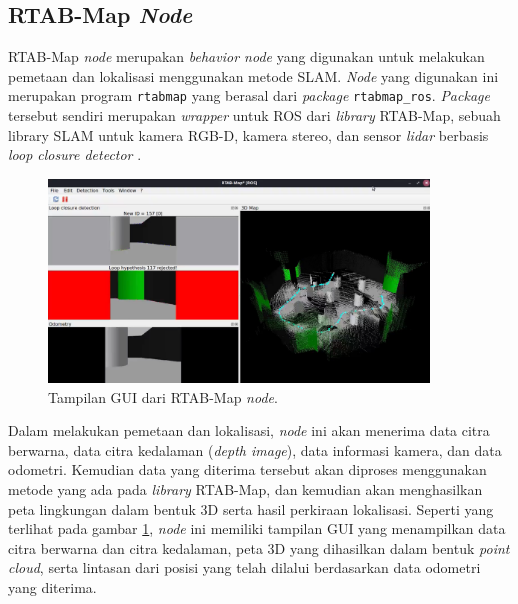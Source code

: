 \subsection{RTAB-Map \emph{Node}}
\label{subsec:rtabmapnode}

RTAB-Map \emph{node} merupakan \emph{behavior node} yang digunakan untuk melakukan pemetaan dan lokalisasi menggunakan metode SLAM.
\emph{Node} yang digunakan ini merupakan program \lstinline{rtabmap} yang berasal dari \emph{package} \lstinline{rtabmap_ros}.
\emph{Package} tersebut sendiri merupakan \emph{wrapper} untuk ROS dari \emph{library} RTAB-Map,
  sebuah library SLAM untuk kamera RGB-D, kamera stereo, dan sensor \emph{lidar} berbasis \emph{loop closure detector} \citep{cit:labbe2019}.

\begin{figure}[ht]
  \centering
  \includegraphics[width=0.9\textwidth,keepaspectratio]{gambar/tampilan-rtabmap.png}
  \caption{Tampilan GUI dari RTAB-Map \emph{node}.}
  \label{fig:tampilanrtabmap}
\end{figure}

Dalam melakukan pemetaan dan lokalisasi,
  \emph{node} ini akan menerima data citra berwarna,
  data citra kedalaman (\emph{depth image}),
  data informasi kamera,
  dan data odometri.
Kemudian data yang diterima tersebut akan diproses menggunakan metode yang ada pada \emph{library} RTAB-Map,
  dan kemudian akan menghasilkan peta lingkungan dalam bentuk 3D serta hasil perkiraan lokalisasi.
Seperti yang terlihat pada gambar \ref{fig:tampilanrtabmap},
  \emph{node} ini memiliki tampilan GUI yang menampilkan data citra berwarna dan citra kedalaman,
  peta 3D yang dihasilkan dalam bentuk \emph{point cloud},
  serta lintasan dari posisi yang telah dilalui berdasarkan data odometri yang diterima.
